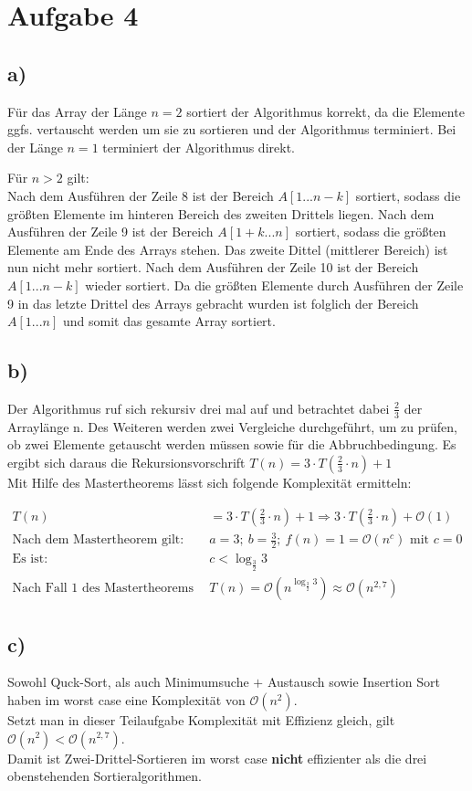 \documentclass[a4paper]{scrartcl}
\begin{document}
\section*{Aufgabe 4}
\subsection*{a)}
Für das Array der Länge $n = 2$ sortiert der Algorithmus korrekt, da die Elemente ggfs. vertauscht werden um sie zu sortieren und der Algorithmus terminiert. Bei der Länge $n = 1$ terminiert der Algorithmus direkt.

Für $n > 2$ gilt: \\
Nach dem Ausführen der Zeile 8 ist der Bereich $A\left[ 1...n-k \right]$ sortiert, sodass die größten Elemente im hinteren Bereich des zweiten Drittels liegen. Nach dem Ausführen der Zeile 9 ist der Bereich $A\left[1+k...n\right]$ sortiert, sodass die größten Elemente am Ende des Arrays stehen. Das zweite Dittel (mittlerer Bereich) ist nun nicht mehr sortiert. Nach dem Ausführen der Zeile 10 ist der Bereich $A\left[ 1...n-k \right]$ wieder sortiert. Da die größten Elemente durch Ausführen der Zeile 9 in das letzte Drittel des Arrays gebracht wurden ist folglich der Bereich $A\left[ 1...n \right]$ und somit das gesamte Array sortiert.

\subsection*{b)}
Der Algorithmus ruf sich rekursiv drei mal auf und betrachtet dabei $\frac{2}{3}$ der Arraylänge n. Des Weiteren werden zwei Vergleiche durchgeführt, um zu prüfen, ob zwei Elemente getauscht werden müssen sowie für die Abbruchbedingung. Es ergibt sich daraus die Rekursionsvorschrift $T(n) = 3 \cdot T\left(\frac{2}{3} \cdot n\right) + 1$ \\
Mit Hilfe des Mastertheorems lässt sich folgende Komplexität ermitteln:

\begin{align*}
T(n) &= 3 \cdot T\left( \frac{2}{3} \cdot n \right) + 1 \Rightarrow 3 \cdot T\left(\frac{2}{3} \cdot n\right) + \mathcal{O}(1) \\
\text{Nach dem Mastertheorem gilt: } &a = 3; ~ b = \frac{3}{2}; ~ f(n) = 1 = \mathcal{O}(n^c) \text{ mit } c = 0 \\
\text{Es ist: } &c < \log_{\frac{3}{2}} 3 \\
\text{Nach Fall 1 des Mastertheorems gilt: } &T(n) = \mathcal{O}(n^{\log_{\frac{3}{2}} 3}) \approx \mathcal{O}(n^{2,7})
\end{align*}

\subsection*{c)}
Sowohl Quck-Sort, als auch Minimumsuche $+$ Austausch sowie Insertion Sort haben im worst case eine Komplexität von $\mathcal{O}(n^{2})$. \\
Setzt man in dieser Teilaufgabe Komplexität mit Effizienz gleich, gilt $\mathcal{O}(n^{2}) < \mathcal{O}(n^{2,7})$. \\
Damit ist Zwei-Drittel-Sortieren im worst case \textbf{nicht} effizienter als die drei obenstehenden Sortieralgorithmen.
\end{document}
